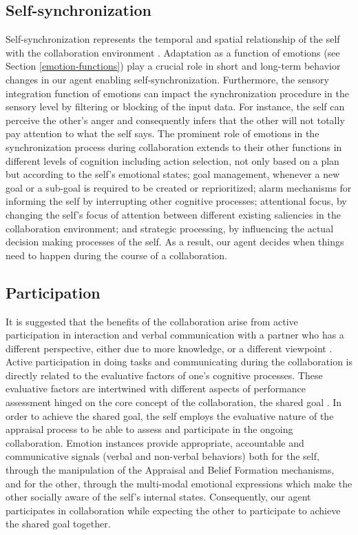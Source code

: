 \documentclass[letterpaper]{article}
\begin{document}
\subsection{Self-synchronization} Self-synchronization represents the temporal
and spatial relationship of the self with the collaboration environment
\cite{manso:synchronization}. Adaptation as a function of emotions (see Section
\ref{emotion-functions}) play a crucial role in short and long-term behavior
changes in our agent enabling self-synchronization. Furthermore, the sensory
integration function of emotions can impact the synchronization procedure in
the sensory level by filtering or blocking of the input data. For instance, the
self can perceive the other's anger and consequently infers that the other will
not totally pay attention to what the self says. The prominent role of emotions
in the synchronization process during collaboration extends to their other
functions in different levels of cognition including action selection, not only
based on a plan but according to the self's emotional states; goal management,
whenever a new goal or a sub-goal is required to be created or reprioritized;
alarm mechanisms for informing the self by interrupting other cognitive
processes; attentional focus, by changing the self's focus of attention between
different existing saliencies in the collaboration environment; and strategic
processing, by influencing the actual decision making processes of the self. As
a result, our agent decides when things need to happen during the course of a
collaboration.

\subsection{Participation} It is suggested that the benefits of the
collaboration arise from active participation in interaction and verbal
communication with a partner who has a different perspective, either due to more
knowledge, or a different viewpoint \cite{kruger:peer-collaboration}. Active
participation in doing tasks and communicating during the collaboration is
directly related to the evaluative factors of one's cognitive processes. These
evaluative factors are intertwined with different aspects of performance
assessment hinged on the core concept of the collaboration, the shared goal . In
order to achieve the shared goal, the self employs the evaluative nature of the
appraisal process to be able to assess and participate in the ongoing
collaboration. Emotion instances provide appropriate, accountable and
communicative signals (verbal and non-verbal behaviors) both for the self,
through the manipulation of the Appraisal and Belief Formation mechanisms, and
for the other, through the multi-modal emotional expressions which make the
other socially aware of the self's internal states. Consequently, our agent
participates in collaboration while expecting the other to participate to
achieve the shared goal together.
\end{document}
